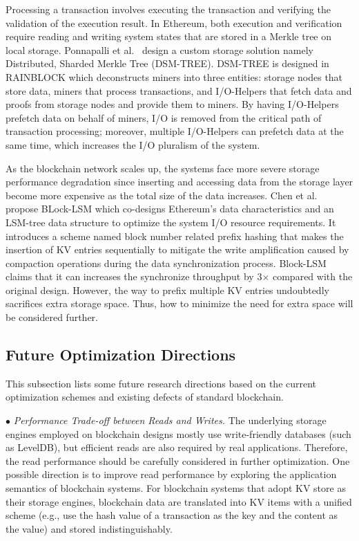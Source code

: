 \documentclass[acmsmall]{acmart}
\begin{document}
Processing a transaction involves executing the transaction and verifying the validation of the execution result. In Ethereum, both execution and verification require reading and writing system states that are stored in a Merkle tree on local storage. Ponnapalli et al.~\cite{DBLP:conf/usenix/PonnapalliSBMTC21} design a custom storage solution namely Distributed, Sharded Merkle Tree (DSM-TREE). DSM-TREE is designed in RAINBLOCK which deconstructs miners into three entities: storage nodes that store data, miners that process transactions, and I/O-Helpers that fetch data and proofs from storage nodes and provide them to miners. By having I/O-Helpers prefetch data on behalf of miners, I/O is removed from the critical path of transaction processing; moreover, multiple I/O-Helpers can prefetch data at the same time, which increases the I/O pluralism of the system.



As the blockchain network scales up, the systems face more severe storage performance degradation since inserting and accessing data from the storage layer become more expensive as the total size of the data increases. Chen et al.~\cite{chenzehao} propose BLock-LSM which co-designs Ethereum's data characteristics and an LSM-tree data structure to optimize the system I/O resource requirements. It introduces a scheme named block number related prefix hashing that makes the insertion of KV entries sequentially to mitigate the write amplification caused by compaction operations during the data synchronization process. Block-LSM claims that it can increases the synchronize throughput by 3$\times$ compared with the original design. However, the way to prefix multiple KV entries undoubtedly sacrifices extra storage space. Thus, how to minimize the need for extra space will be considered further.


\subsection{Future Optimization Directions}

This subsection lists some future research directions based on the current optimization schemes and existing defects of standard blockchain.


$\bullet$ {\it Performance Trade-off between Reads and Writes.}
The underlying storage engines employed on blockchain designs mostly use write-friendly databases (such as LevelDB), but efficient reads are also required by real applications. Therefore, the read performance should be carefully considered in further optimization. One possible direction is to improve read performance by exploring the application semantics of blockchain systems. For blockchain systems that adopt KV store as their storage engines, blockchain data are translated into KV items with a unified scheme (e.g., use the hash value of a transaction as the key and the content as the value) and stored indistinguishably.
\end{document}
